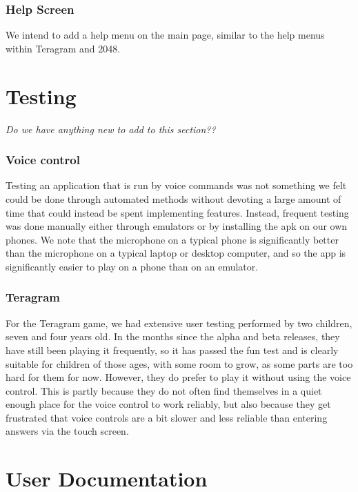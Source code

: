 \documentclass[11pt, oneside]{article}
\begin{document}
\subsubsection*{Help Screen}

We intend to add a help menu on the main page, similar to the help
menus within Teragram and 2048.


\section{Testing}

{\em Do we have anything new to add to this section??}

\subsubsection*{Voice control}

Testing an application that is run by voice commands was not something
we felt could be done through automated methods without devoting a
large amount of time that could instead be spent implementing
features. Instead, frequent testing was done manually either through
emulators or by installing the apk on our own phones. We note that the
microphone on a typical phone is significantly better than the
microphone on a typical laptop or desktop computer, and so the app is
significantly easier to play on a phone than on an emulator.


\subsubsection*{Teragram}

For the Teragram game, we had extensive user testing performed by two
children, seven and four years old. In the months since the alpha and beta
releases, they have still been playing it frequently, so it has passed
the fun test and is clearly suitable for children of those ages, with
some room to grow, as some parts are too hard for them for
now. However, they do prefer to play it without using the voice
control. This is partly because they do not often find themselves in a
quiet enough place for the voice control to work reliably, but also
because they get frustrated that voice controls are a bit slower and
less reliable than entering answers via the touch screen.

\pagebreak

\section{User Documentation}
\end{document}
